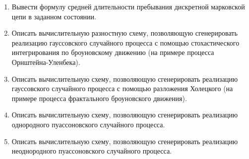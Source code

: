 \documentclass[a4paper,12pt]{extreport}
\renewcommand{\=}[1]{\stackrel{#1}{=}} %
\begin{document}
\begin{enumerate}
	\item Вывести формулу средней длительности пребывания дискретной марковской цепи
	в заданном состоянии.

	\item Описать вычислительную разностную схему, позволяющую
	сгенерировать реализацию гауссовского случайного процесса 
	с помощью стохастического интегрирования по броуновскому движению
	(на примере процесса Орнштейна-Уленбека).

	\item Описать вычислительную схему, позволяющую
	сгенерировать реализацию гауссовского случайного процесса 
	с помощью разложения Холецкого
	(на примере процесса фрактального броуновского движения).

	\item Описать вычислительную схему, позволяющую
	сгенерировать реализацию однородного пуассоновского случайного процесса.

	\item Описать вычислительную схему, позволяющую
	сгенерировать реализацию неоднородного пуассоновского случайного процесса.

\end{enumerate}

\newpage

\section*{}
\end{document}
